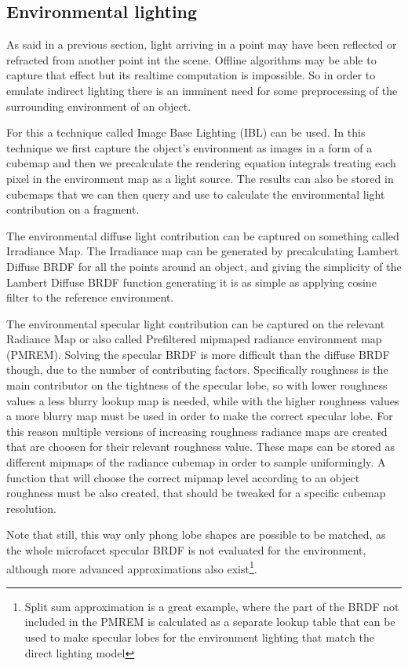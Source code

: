 \subsection{Environmental lighting}
As said in a previous section, light arriving in a point may have been reflected or refracted from another point int the scene.
Offline algorithms may be able to capture that effect but its realtime computation is impossible. So in order to emulate indirect
lighting there is an imminent need for some preprocessing of the surrounding environment of an object.

For this a technique called Image Base Lighting (IBL) can be used. In this technique we first capture the object's environment
as images in a form of a cubemap and then we precalculate the rendering equation integrals treating each pixel in the environment
map as a light source. The results can also be stored in cubemaps that we can then query and use to calculate the environmental
light contribution on a fragment.

The environmental diffuse light contribution can be captured on something called Irradiance Map. The Irradiance map can be generated
by precalculating Lambert Diffuse BRDF for all the points around an object, and giving the simplicity of the Lambert Diffuse BRDF
function generating it is as simple as applying cosine filter to the reference environment.

The environmental specular light contribution can be captured on the relevant Radiance Map or also called Prefiltered mipmaped
radiance environment map (PMREM). Solving the specular BRDF is more difficult than the diffuse BRDF though, due to the number of
contributing factors. Specifically roughness is the main contributor on the tightness of the specular lobe, so with lower roughness
values a less blurry lookup map is needed, while with the higher roughness values a more blurry map must be used in order to make
the correct specular lobe. For this reason multiple versions of increasing roughness radiance maps are created that are choosen
for their relevant roughness value. These maps can be stored as different mipmaps of the radiance cubemap in order to sample uniformingly.
A function that will choose the correct mipmap level according to an object roughness must be also created, that should be tweaked
for a specific cubemap resolution.

Note that still, this way only phong lobe shapes are possible to be matched, as the whole microfacet specular
BRDF is not evaluated for the environment, although more advanced approximations also exist\footnote{Split sum approximation is a great
example, where the part of the BRDF not included in the PMREM is calculated as a separate lookup table that can be used to make
specular lobes for the environment lighting that match the direct lighting model}.
